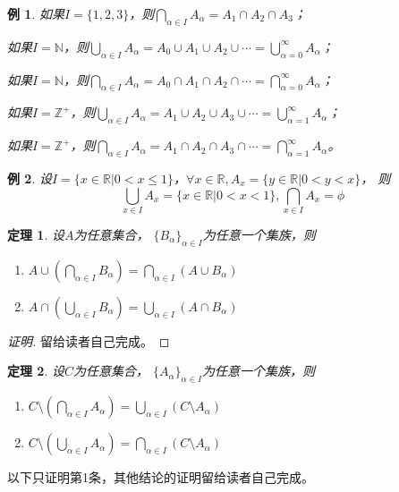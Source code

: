 \documentclass{book}[oneside]
\newtheorem{Thm}{定理}[chapter]
\newtheorem*{Example}{例}
\begin{document}
\begin{CJK*}{UTF8}{gbsn}
\begin{Example}
    如果$I=\{1,2,3\}$，则$\bigcap_{\alpha \in I}A_{\alpha} =A_1\cap A_2\cap A_3$；

    如果$I=\mathbb{N}$，则$\bigcup_{\alpha \in I}A_{\alpha} =A_0\cup A_1\cup A_2\cup\cdots=\bigcup_{\alpha=0}^{\infty}A_{\alpha}$；
    
    如果$I=\mathbb{N}$，则$\bigcap_{\alpha \in I}A_{\alpha} =A_0\cap A_1\cap A_2\cap\cdots=\bigcap_{\alpha=0}^{\infty}A_{\alpha}$；

    如果$I=\mathbb{Z}^+$，则$\bigcup_{\alpha \in I}A_{\alpha} =A_1\cup A_2\cup A_3\cup\cdots=\bigcup_{\alpha=1}^{\infty}A_{\alpha}$；
    
    如果$I=\mathbb{Z}^+$，则$\bigcap_{\alpha \in I}A_{\alpha} =A_1\cap A_2\cap A_3\cap\cdots=\bigcap_{\alpha=1}^{\infty}A_{\alpha}$。
\end{Example}
  \begin{Example}
    设$I=\{x \in \mathbb{R} | 0 < x \leq 1\}$，$\forall x \in \mathbb{R}, A_x=\{y\in \mathbb{R}|0 < y < x\}$，
    则
    \begin{equation*}
      \bigcup_{x\in I}A_x=\{x \in \mathbb{R} | 0 < x < 1\},
      \bigcap_{x\in I}A_x=\phi      
    \end{equation*}
  \end{Example}

  \begin{Thm}
设$A$为任意集合， $\{B_{\alpha}\}_{\alpha \in I}$为任意一个集族，则
\begin{enumerate}
  \item $A \cup (\bigcap_{\alpha \in I}B_{\alpha}) = \bigcap_{\alpha \in I}(A \cup B_{\alpha})$
  \item $A \cap (\bigcup_{\alpha \in I}B_{\alpha}) = \bigcup_{\alpha \in I}(A \cap B_{\alpha})$
\end{enumerate}
\end{Thm}
\begin{proof}[证明]
  留给读者自己完成。
\end{proof}
\begin{Thm}
  设$C$为任意集合， $\{A_{\alpha}\}_{\alpha \in I}$为任意一个集族，则
  \begin{enumerate}
  \item $C\setminus(\bigcap_{\alpha \in I}A_{\alpha})=\bigcup_{\alpha\in I}(C\setminus A_{\alpha})$
  \item $C\setminus(\bigcup_{\alpha \in I}A_{\alpha})=\bigcap_{\alpha\in I}(C\setminus A_{\alpha})$
  \end{enumerate}
  \end{Thm}
  以下只证明第1条，其他结论的证明留给读者自己完成。


\end{CJK*}
\end{document}
